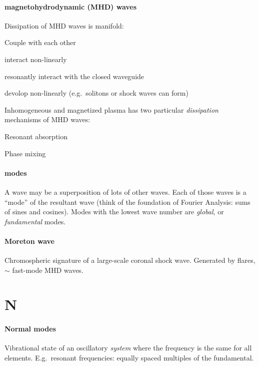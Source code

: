 \documentclass[12pt]{article}
\begin{document}
\paragraph{magnetohydrodynamic (MHD) waves}
\begin{itemize*}
    \item Dissipation of MHD waves is manifold:
        \begin{itemize*}
            \item Couple with each other
            \item interact non-linearly
            \item resonantly interact with the closed waveguide
            \item devolop non-linearly (e.g.\ solitons or shock waves
                can form)
        \end{itemize*}
    \item Inhomogeneous and magnetized plasma has two particular
        \emph{dissipation} mechanisms of MHD waves:
        \begin{itemize*}
            \item Resonant absorption
            \item Phase mixing
        \end{itemize*}
\end{itemize*}


\paragraph{modes}
A wave may be a superposition of lots of other waves. Each of those
waves is a ``mode'' of the resultant wave (think of the foundation
of Fourier Analysis: sums of sines and cosines).
Modes with the lowest wave number are \emph{global}, or
\emph{fundamental} modes.

\paragraph{Moreton wave}
Chromospheric signature of a large-scale coronal shock wave. Generated
by flares, $\sim$ fast-mode MHD waves.

\section*{N}
\paragraph{Normal modes}
Vibrational state of an oscillatory \emph{system} where the frequency
is the same for all elements. E.g.\ resonant frequencies: equally
spaced multiples of the fundamental.
\end{document}
